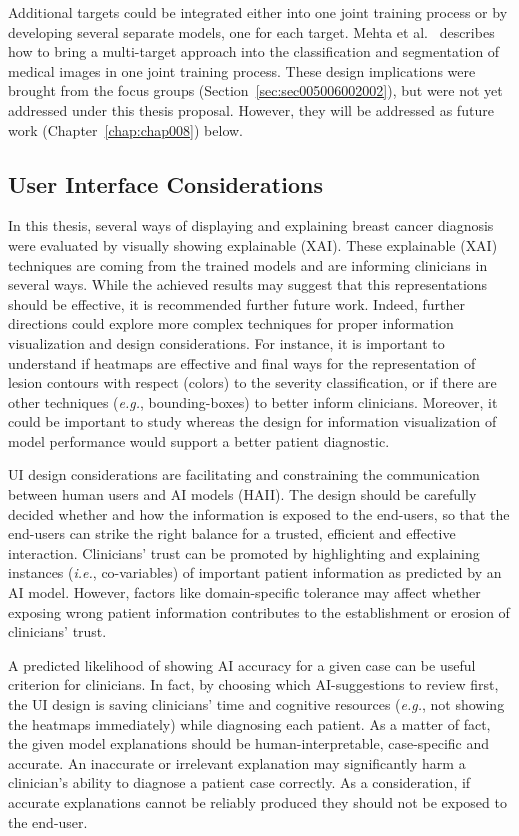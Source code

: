 Additional targets could be integrated either into one joint training process or by developing several separate models, one for each target.
Mehta et al.~\cite{10.1007/978-3-030-00934-2_99} describes how to bring a multi-target approach into the classification and segmentation of medical images in one joint training process.
These design implications were brought from the focus groups (Section~\ref{sec:sec005006002002}), but were not yet addressed under this thesis proposal.
However, they will be addressed as future work (Chapter~\ref{chap:chap008}) below.

\subsection{User Interface Considerations}
\label{sec:sec007004003}

In this thesis, several ways of displaying and explaining breast cancer diagnosis were evaluated by visually showing explainable (\ac{XAI}).
These explainable (\ac{XAI}) techniques are coming from the trained models and are informing clinicians in several ways.
While the achieved results may suggest that this representations should be effective, it is recommended further future work.
Indeed, further directions could explore more complex techniques for proper information visualization and design considerations.
For instance, it is important to understand if heatmaps are effective and final ways for the representation of lesion contours with respect (colors) to the severity classification, or if there are other techniques ({\it e.g.}, bounding-boxes) to better inform clinicians.
Moreover, it could be important to study whereas the design for information visualization of model performance would support a better patient diagnostic.

\ac{UI} design considerations are facilitating and constraining the communication between human users and \ac{AI} models (\ac{HAII}).
The design should be carefully decided whether and how the information is exposed to the end-users, so that the end-users can strike the right balance for a trusted, efficient and effective interaction.
Clinicians' trust can be promoted by highlighting and explaining instances ({\it i.e.}, co-variables) of important patient information as predicted by an \ac{AI} model.
However, factors like domain-specific tolerance may affect whether exposing wrong patient information contributes to the establishment or erosion of clinicians' trust.

A predicted likelihood of showing \ac{AI} accuracy for a given case can be useful criterion for clinicians.
In fact, by choosing which \ac{AI}-suggestions to review first, the \ac{UI} design is saving clinicians' time and cognitive resources ({\it e.g.}, not showing the heatmaps immediately) while diagnosing each patient.
As a matter of fact, the given model explanations should be human-interpretable, case-specific and accurate.
An inaccurate or irrelevant explanation may significantly harm a clinician's ability to diagnose a patient case correctly.
As a consideration, if accurate explanations cannot be reliably produced they should not be exposed to the end-user.

